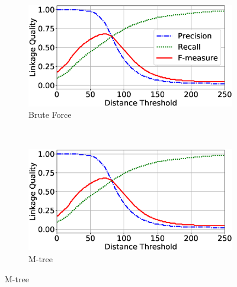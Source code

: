 \documentclass{llncs}
\begin{document}
\begin{figure}
\centering
\begin{subfigure}{.47\textwidth}
  \centering
\includegraphics[width=\textwidth]{figures/plotLQ-cora-brute}
\caption{Brute Force}
\end{subfigure}%
~~
\begin{subfigure}{.47\textwidth}
  \centering
\includegraphics[width=\textwidth]{figures/plotLQ-cora-mtree}
\caption{M-tree}
\end{subfigure} %


\end{figure}
\end{document}
